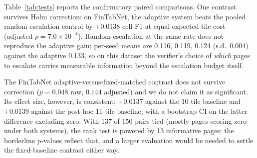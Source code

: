 \documentclass[conference]{IEEEtran}
\begin{document}
\begin{table}[t]
  \centering
  \caption{Paired Wilcoxon tests on per-page cell-F1. The first four rows
  are the pre-specified confirmatory family (Holm-corrected); the last
  row is the post-hoc over-budget check (exploratory, uncorrected, with a
  bootstrap CI on the mean paired difference). ``Inf.\ pairs'' counts
  non-tied pairs actually entering each test; ties at zero are common
  because many very-complex pages score 0 under every system.}
  \label{tab:tests}
  \footnotesize
  \setlength{\tabcolsep}{2.5pt}
\end{table}

Table~\ref{tab:tests} reports the confirmatory paired comparisons. One
contrast survives Holm correction: on FinTabNet, the adaptive system
beats the pooled random-escalation control by $+0.0138$ cell-F1 at equal
expected tile cost (adjusted $p = 7.0\times10^{-4}$). Random escalation
at the same rate does not reproduce the adaptive gain; per-seed means are
0.116, 0.119, 0.124 (s.d.\ 0.004) against the adaptive 0.133, so on
this dataset the verifier's choice of \emph{which} pages to escalate
carries measurable information beyond the escalation budget itself.

The FinTabNet adaptive-versus-fixed-matched contrast does not survive
correction ($p = 0.048$ raw, $0.144$ adjusted) and we do not claim it as
significant. Its effect size, however, is consistent: $+0.0137$ against
the 10-tile baseline and $+0.0139$ against the post-hoc 11-tile baseline,
with a bootstrap CI on the latter difference excluding zero. With 137 of
150 pairs tied (mostly pages scoring zero under both systems), the rank
test is powered by 13 informative pages; the borderline p-values reflect
that, and a larger evaluation would be needed to settle the
fixed-baseline contrast either way.
\end{document}
